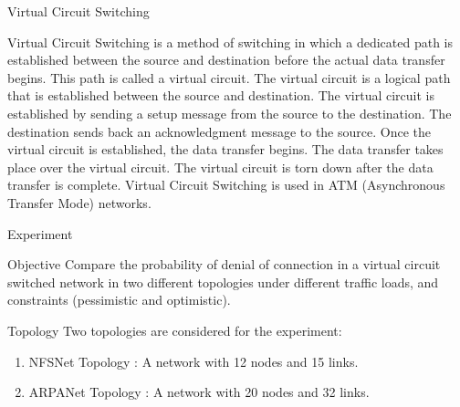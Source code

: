
\begin{section}{Virtual Circuit Switching}

Virtual Circuit Switching is a method of switching in which a dedicated path is established between the source and destination before the actual data transfer begins. This path is called a virtual circuit. The virtual circuit is a logical path that is established between the source and destination. The virtual circuit is established by sending a setup message from the source to the destination. The destination sends back an acknowledgment message to the source. Once the virtual circuit is established, the data transfer begins. The data transfer takes place over the virtual circuit. The virtual circuit is torn down after the data transfer is complete. Virtual Circuit Switching is used in ATM (Asynchronous Transfer Mode) networks.

\end{section}


\begin{section}{Experiment}

    \begin{subsection}{Objective}
        Compare the probability of denial of connection in a virtual circuit switched network in two different topologies under different traffic loads, and constraints (pessimistic and optimistic).

    \end{subsection}


    \begin{subsection}{Topology}
        Two topologies are considered for the experiment:
        \begin{enumerate}
            \item NFSNet Topology : A network with 12 nodes and 15 links.
            \item ARPANet Topology : A network with 20 nodes and 32 links.
        \end{enumerate}
    \end{subsection}

    

\end{section}